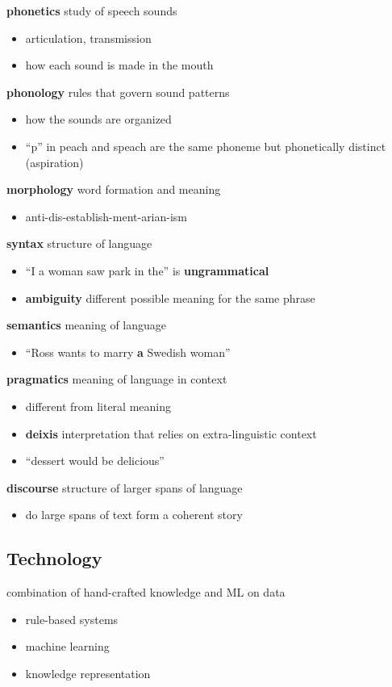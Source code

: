 \documentclass[]{article}
\theoremstyle{definition}
\begin{document}
\textbf{phonetics} study of speech sounds
\begin{itemize}
    \item articulation, transmission
    \item how each sound is made in the mouth
\end{itemize}
\textbf{phonology} rules that govern sound patterns
\begin{itemize}
    \item how the sounds are organized
    \item ``p'' in peach and speach are the same phoneme but phonetically distinct (aspiration)
\end{itemize}
\textbf{morphology} word formation and meaning
\begin{itemize}
    \item anti-dis-establish-ment-arian-ism
\end{itemize}
\textbf{syntax} structure of language
\begin{itemize}
    \item ``I a woman saw park in the'' is \textbf{ungrammatical}
    \item \textbf{ambiguity} different possible meaning for the same phrase
\end{itemize}
\textbf{semantics} meaning of language
\begin{itemize}
    \item ``Ross wants to marry \textbf{a} Swedish woman''
\end{itemize}
\textbf{pragmatics} meaning of language in context
\begin{itemize}
    \item different from literal meaning
    \item \textbf{deixis} interpretation that relies on extra-linguistic context
    \item ``dessert would be delicious''
\end{itemize}
\textbf{discourse} structure of larger spans of language
\begin{itemize}
    \item do large spans of text form a coherent story
\end{itemize}

\subsection{Technology}%
\label{sub:technology}

combination of hand-crafted knowledge and ML on data
\begin{itemize}
    \item rule-based systems
    \item machine learning
    \item knowledge representation
\end{itemize}
\end{document}
